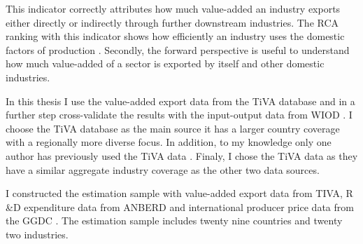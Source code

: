   This indicator correctly attributes how much value-added an industry exports either directly or indirectly through further downstream industries.
  The RCA ranking with this indicator shows how efficiently an industry uses the domestic factors of production  \textcite{baldwin2014}. %
Secondly, the forward perspective is useful to understand how much value-added of a sector is exported by itself and other domestic industries.
\par %
 In this thesis I use the value-added export data from the TiVA \textcite{tiva2} database and in a further step cross-validate the results with the input-output data from WIOD \textcite{Timmer2012}.
I choose the TiVA database as the main source it has a larger country coverage with a regionally more diverse focus.
In addition, to my knowledge only one author has previously used the TiVA data  \parencite{johnson}.
Finaly, I chose the TiVA data  as they  have a similar aggregate industry coverage as the other two data sources. \par
I constructed the estimation sample with value-added export data from TIVA, R \&D expenditure data from \textcite{stan2} ANBERD and  international producer price data from the GGDC  \parencite{Inklaar2012}.
The estimation sample includes twenty nine countries and twenty two industries. \par
